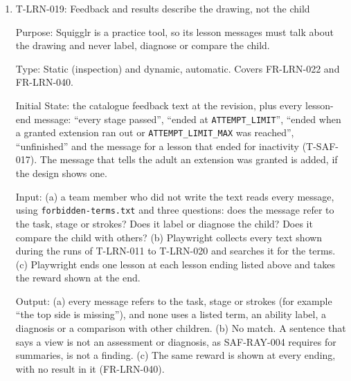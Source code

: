 \documentclass[12pt, titlepage]{article}
\newcommand{\testitem}[1]{\item #1\par\nopagebreak}
\begin{document}
\begin{enumerate}
Test Case Derivation: ``End at limit'' in SRS Section~9.2, at the minimum
and maximum \texttt{ATTEMPT\_LIMIT} in (a) and (b), at a later stage in
(c) and from a later start in (d). In (e), the furthest stage is kept when
the adult moves the child back (``retain the lesson's furthest stage
reached''). In (h), E is entered again with three failures already
counted, so the lesson ends at the eighth failure at E in the lesson
record (Table~\ref{tab:srs-conflicts}, SC1). In (f), only evaluable
attempts count. In (g), a pass
takes priority over the limit. The extension cases are in T-LRN-017.

How test will be performed: Vitest runs every case. Playwright runs (a)
and (c) with \texttt{circle-\allowbreak{}fail.json} and
\texttt{circle.json}, reading the furthest stage from the lesson record.

\testitem{T-LRN-019: Feedback and results describe the drawing, not the child}

Purpose: Squigglr is a practice tool, so its lesson messages must talk
about the drawing and never label, diagnose or compare the child.

Type: Static (inspection) and dynamic, automatic. Covers FR-LRN-022 and
FR-LRN-040.

Initial State: the catalogue feedback text at the revision, plus every
lesson-end message: ``every stage passed'', ``ended at
\texttt{ATTEMPT\_LIMIT}'', ``ended when a granted extension ran out or
\texttt{ATTEMPT\_LIMIT\_MAX} was reached'', ``unfinished'' and the message for a
lesson that ended for inactivity (T-SAF-017). The message
that tells the adult an extension was granted is added, if the design shows
one.

Input: (a) a team member who did not write the text reads every message,
using \texttt{forbidden-\allowbreak{}terms.txt} and three questions: does
the message refer to the task, stage or strokes? Does it label or diagnose
the child? Does it compare the child with others? (b) Playwright collects
every text shown during the runs of T-LRN-011 to T-LRN-020 and searches it
for the terms. (c) Playwright ends one lesson at each lesson ending listed
above and takes the reward shown at the end.

Output: (a) every message refers to the task, stage or strokes (for
example ``the top side is missing''), and none uses a listed term, an
ability label, a diagnosis or a comparison with other children. (b) No
match. A sentence that says a view is not an assessment or diagnosis, as
SAF-RAY-004 requires for summaries, is not a finding. (c) The same reward is
shown at every ending, with no result in it (FR-LRN-040).


\end{enumerate}
\end{document}
